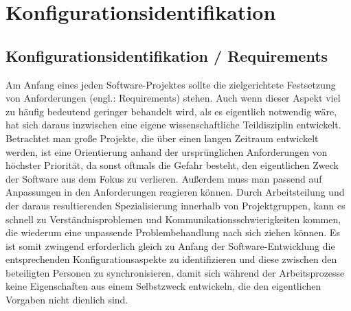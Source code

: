 \chapter{Konfigurationsidentifikation}
\section{Konfigurationsidentifikation / Requirements}
Am Anfang eines jeden Software-Projektes sollte die zielgerichtete Festsetzung von Anforderungen (engl.: Requirements) stehen. Auch wenn dieser Aspekt viel zu häufig bedeutend geringer behandelt wird, als es eigentlich notwendig wäre, hat sich daraus inzwischen eine eigene wissenschaftliche Teildisziplin entwickelt. Betrachtet man große Projekte, die über einen langen Zeitraum entwickelt werden, ist eine Orientierung anhand der ursprünglichen Anforderungen von höchster Priorität, da sonst oftmals die Gefahr besteht, den eigentlichen Zweck der Software aus dem Fokus zu verlieren. Außerdem muss man passend auf Anpassungen in den Anforderungen reagieren können. Durch Arbeitsteilung und der daraus resultierenden Spezialisierung innerhalb von Projektgruppen, kann es schnell zu Verständnisproblemen und Kommunikationsschwierigkeiten kommen, die wiederum eine unpassende Problembehandlung nach sich ziehen können. Es ist somit zwingend erforderlich gleich zu Anfang der Software-Entwicklung die entsprechenden Konfigurationsaspekte zu identifizieren und diese zwischen den beteiligten Personen zu synchronisieren, damit sich während der Arbeitsprozesse keine Eigenschaften aus einem Selbstzweck entwickeln, die den eigentlichen Vorgaben nicht dienlich sind.
%

